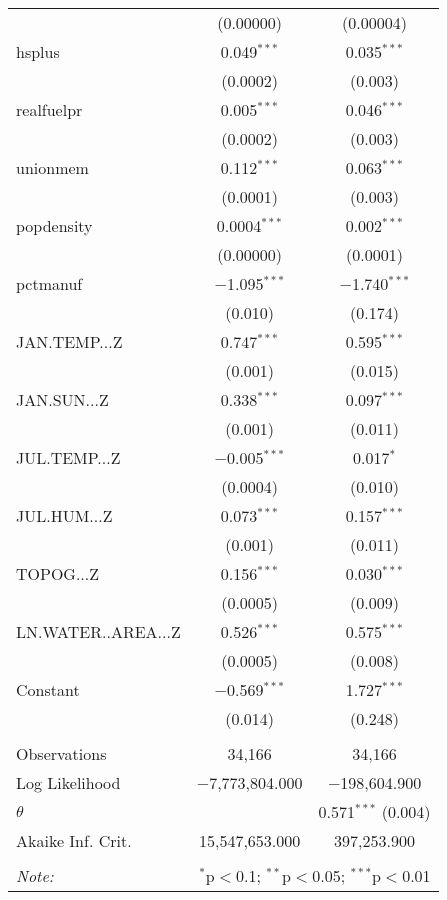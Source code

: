 \begin{table}[!htbp]
\begin{tabular}{@{\extracolsep{5pt}}lcc}
  & (0.00000) & (0.00004) \\ 
  hsplus & 0.049$^{***}$ & 0.035$^{***}$ \\ 
  & (0.0002) & (0.003) \\ 
  realfuelpr & 0.005$^{***}$ & 0.046$^{***}$ \\ 
  & (0.0002) & (0.003) \\ 
  unionmem & 0.112$^{***}$ & 0.063$^{***}$ \\ 
  & (0.0001) & (0.003) \\ 
  popdensity & 0.0004$^{***}$ & 0.002$^{***}$ \\ 
  & (0.00000) & (0.0001) \\ 
  pctmanuf & $-$1.095$^{***}$ & $-$1.740$^{***}$ \\ 
  & (0.010) & (0.174) \\ 
  JAN.TEMP...Z & 0.747$^{***}$ & 0.595$^{***}$ \\ 
  & (0.001) & (0.015) \\ 
  JAN.SUN...Z & 0.338$^{***}$ & 0.097$^{***}$ \\ 
  & (0.001) & (0.011) \\ 
  JUL.TEMP...Z & $-$0.005$^{***}$ & 0.017$^{*}$ \\ 
  & (0.0004) & (0.010) \\ 
  JUL.HUM...Z & 0.073$^{***}$ & 0.157$^{***}$ \\ 
  & (0.001) & (0.011) \\ 
  TOPOG...Z & 0.156$^{***}$ & 0.030$^{***}$ \\ 
  & (0.0005) & (0.009) \\ 
  LN.WATER..AREA...Z & 0.526$^{***}$ & 0.575$^{***}$ \\ 
  & (0.0005) & (0.008) \\ 
  Constant & $-$0.569$^{***}$ & 1.727$^{***}$ \\ 
  & (0.014) & (0.248) \\ 
 \hline \\[-1.8ex] 
Observations & 34,166 & 34,166 \\ 
Log Likelihood & $-$7,773,804.000 & $-$198,604.900 \\ 
$\theta$ &  & 0.571$^{***}$  (0.004) \\ 
Akaike Inf. Crit. & 15,547,653.000 & 397,253.900 \\ 
\hline 
\hline \\[-1.8ex] 
\textit{Note:}  & \multicolumn{2}{r}{$^{*}$p$<$0.1; $^{**}$p$<$0.05; $^{***}$p$<$0.01} \\ 
\end{tabular} 
\end{table} 
